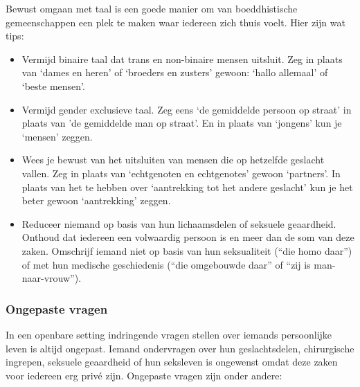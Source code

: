 \documentclass[12pt,openany]{book}
\begin{document}
Bewust omgaan met taal is een goede manier om van boeddhistische gemeenschappen een plek te maken waar iedereen zich thuis voelt.  Hier zijn wat tips:

\begin{itemize}
  \item Vermijd binaire taal dat trans en non-binaire mensen uitsluit. Zeg in plaats van ‘dames en heren’ of ‘broeders en zusters’ gewoon: ‘hallo allemaal’ of ‘beste mensen’.
  \item Vermijd gender exclusieve taal. Zeg eens ‘de gemiddelde persoon op straat’ in plaats van ’de gemiddelde man op straat’. En in plaats van ‘jongens’ kun je ‘mensen’ zeggen.
  \item Wees je bewust van het uitsluiten van mensen die op hetzelfde geslacht vallen. Zeg in plaats van ‘echtgenoten en echtgenotes’ gewoon ‘partners’. In plaats van het te hebben over ‘aantrekking tot het andere geslacht’ kun je het beter gewoon ‘aantrekking’ zeggen.
\item Reduceer niemand op basis van hun lichaamsdelen of seksuele geaardheid. Onthoud dat iedereen een volwaardig persoon is en meer dan de som van deze zaken. Omschrijf iemand niet op basis van hun seksualiteit (“die homo daar”) of met hun medische geschiedenis (“die omgebouwde daar” of “zij is man-naar-vrouw”).
\end{itemize}

\begin{figure}[h]
    \centering
\end{figure}

\subsubsection*{Ongepaste vragen}

In een openbare setting indringende vragen stellen over iemands persoonlijke leven is altijd ongepast. Iemand ondervragen over hun geslachtsdelen, chirurgische ingrepen, seksuele geaardheid of hun seksleven is ongewenst omdat deze zaken voor iedereen erg privé zijn. Ongepaste vragen zijn onder andere: 
\end{document}
